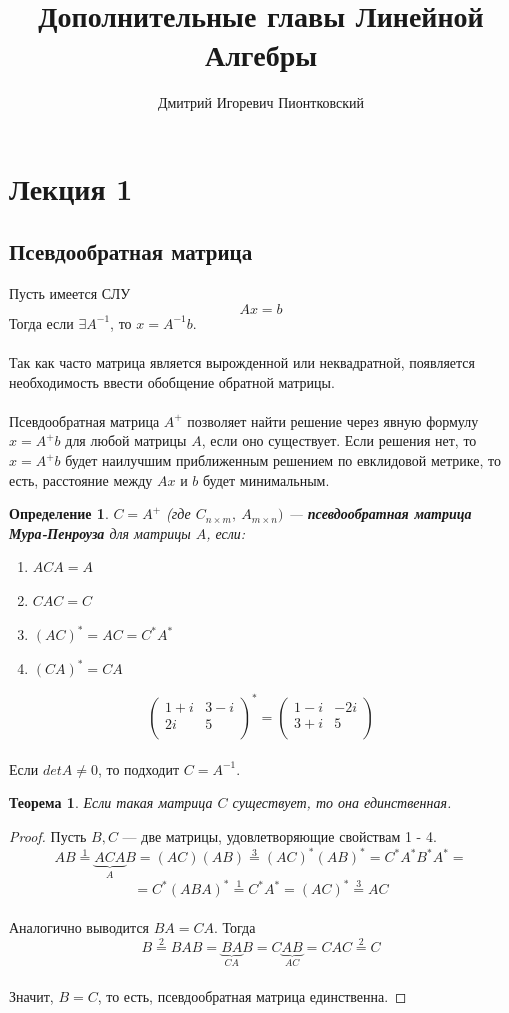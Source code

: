 \documentclass[12pt]{article}
\title{\Huge{Дополнительные главы Линейной Алгебры}}
\author{Дмитрий Игоревич Пионтковский}
\date{}
\newtheorem*{definition}{Определение}
\newtheorem*{theorem}{Теорема}
\begin{document}
	\maketitle
	\tableofcontents
	
	\newpage
	\section{Лекция 1}
	\subsection{Псевдообратная матрица}
	Пусть имеется СЛУ
	$$Ax=b$$
	Тогда если $\exists A^{-1}$, то $x=A^{-1}b$.\\
	\\
	Так как часто матрица является вырожденной или неквадратной, появляется необходимость ввести обобщение обратной матрицы.\\
	\\
	Псевдообратная матрица $A^+$ позволяет найти решение через явную формулу $x=A^+b$ для любой матрицы $A$, если оно существует. Если решения нет, то $x=A^+b$ будет наилучшим приближенным решением по евклидовой метрике, то есть, расстояние между $Ax$ и $b$ будет минимальным.
	\begin{definition}
		$C=A^+$ (где $C_{n \times m}, ~A_{m \times n})$ --- \textbf{псевдообратная матрица Мура-Пенроуза} для матрицы $A$, если:
	\begin{enumerate}
		\item $ACA=A$
		\item $CAC=C$
		\item $(AC)^*=AC=C^*A^*$
		\item $(CA)^*=CA$
	\end{enumerate}
	\end{definition}
	\[\begin{pmatrix}
	1+i & 3-i\\
	2i & 5\\
	\end{pmatrix}^* = \begin{pmatrix}
	1-i & -2i\\
	3+i & 5\\
	\end{pmatrix}\]
	\\ 
	Если $detA \neq 0$, то подходит $C=A^{-1}$.
	\begin{theorem}
		Если такая матрица $C$ существует, то она единственная.
	\end{theorem}
	\begin{proof}
		Пусть $B, C$ --- две матрицы, удовлетворяющие свойствам 1 - 4.\\
	$$AB\overset{1}{=}\underbrace{ACA}_{A}B=(AC)(AB)\overset{3}{=}(AC)^*(AB)^*=C^*A^*B^*A^*=$$
	$$=C^*(ABA)^*\overset{1}{=}C^*A^*=(AC)^*\overset{3}{=}AC$$\\
	Аналогично выводится $BA=CA$. Тогда
	$$B\overset{2}{=}BAB=\underbrace{BA}_{CA}B=C\underbrace{AB}_{AC}=CAC\overset{2}{=}C$$\\
	Значит, $B=C$, то есть, псевдообратная матрица единственна.
	\end{proof}
\end{document}
